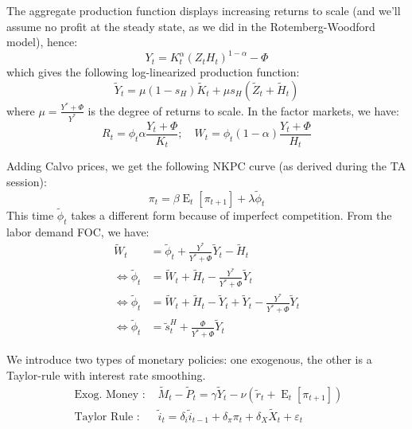 \documentclass[12pt]{report}
\newcommand{\Et}[1]{\operatorname{E}_t\left[#1\right]}
\begin{document}
The aggregate production function displays increasing returns to scale (and we'll assume no profit at the steady state, as we did in the Rotemberg-Woodford model), hence: $$Y_t = K_t^\alpha (Z_tH_t)^{1-\alpha} - \Phi $$ which gives the following log-linearized production function:$$ \tilde Y_t = \mu(1 -s_{H})\tilde{K}_t + \mu s_H(\tilde{Z}_t + \tilde{H}_t) $$ where $\mu = \frac{Y^* + \Phi}{Y^*}$ is the degree of returns to scale. In the factor markets, we have: $$R_t = \phi_t\alpha\frac{Y_t + \Phi}{K_t} ; \quad W_t = \phi_t(1 - \alpha)\frac{Y_t + \Phi}{H_t} $$

Adding Calvo prices, we get the following NKPC curve (as derived during the TA session): $$\pi_t = \beta\Et{\pi_{t+1}} + \lambda\tilde \phi_t $$ This time $\tilde\phi_t$ takes a different form because of imperfect competition. From the labor demand FOC, we have: \begin{align*}
\tilde W_t & = \tilde\phi_t + \frac{Y^*}{Y^* + \Phi} \tilde Y_t - \tilde H_t \\ \Leftrightarrow \tilde\phi_t & =\tilde W_t  +\tilde H_t  - \frac{Y^*}{Y^* + \Phi} \tilde Y_t \\ \Leftrightarrow \tilde\phi_t & = \tilde W_t  + \tilde H_t - \tilde Y_t + \tilde Y_t - \frac{Y^*}{Y^* + \Phi} \tilde Y_t \\
\Leftrightarrow \tilde\phi_t & = \tilde s_t^H + \frac{\Phi}{Y^* + \Phi} \tilde Y_t
\end{align*}

We introduce two types of monetary policies: one exogenous, the other is a Taylor-rule with interest rate smoothing. \begin{align*} 
\text{ Exog. Money : } & \tilde M_t - \tilde P_t = \gamma \tilde Y_t - \nu (\tilde r_t + \Et{\pi_{t+1}}) \\ 
\text{ Taylor Rule : } & \tilde i_t = \delta_i \tilde i_{t-1} + \delta_\pi \pi_t + \delta_X \tilde X_t + \varepsilon_t
\end{align*}
\end{document}
